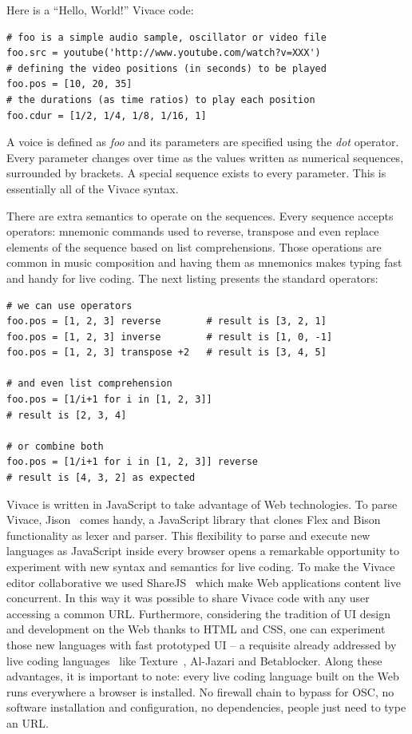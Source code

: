 \documentclass[letterpaper, 12pt]{article}
\begin{document}
Here is a ``Hello, World!'' Vivace code:

\begin{Verbatim}[fontfamily=courier, xleftmargin=\parindent]
# foo is a simple audio sample, oscillator or video file
foo.src = youtube('http://www.youtube.com/watch?v=XXX')
# defining the video positions (in seconds) to be played
foo.pos = [10, 20, 35]
# the durations (as time ratios) to play each position
foo.cdur = [1/2, 1/4, 1/8, 1/16, 1]
\end{Verbatim}

A voice is defined as \textit{foo} and its parameters are specified
using the \textit{dot} operator. Every parameter changes over time as
the values written as numerical sequences, surrounded by brackets. A
special sequence exists to every parameter. This is essentially all of
the Vivace syntax.

There are extra semantics to operate on the sequences. Every sequence
accepts operators: mnemonic commands used to reverse, transpose and
even replace elements of the sequence based on list
comprehensions. Those operations are common in music composition and
having them as mnemonics makes typing fast and handy for live
coding. The next listing presents the standard operators:

\begin{Verbatim}[fontfamily=courier, xleftmargin=\parindent]
# we can use operators
foo.pos = [1, 2, 3] reverse        # result is [3, 2, 1]
foo.pos = [1, 2, 3] inverse        # result is [1, 0, -1]
foo.pos = [1, 2, 3] transpose +2   # result is [3, 4, 5]

# and even list comprehension
foo.pos = [1/i+1 for i in [1, 2, 3]] 
# result is [2, 3, 4]

# or combine both
foo.pos = [1/i+1 for i in [1, 2, 3]] reverse 
# result is [4, 3, 2] as expected
\end{Verbatim}

Vivace is written in JavaScript to take advantage of Web technologies.
To parse Vivace, Jison~\citep*{jison} comes handy, a JavaScript
library that clones Flex and Bison functionality as lexer and
parser. This flexibility to parse and execute new languages as
JavaScript inside every browser opens a remarkable opportunity to
experiment with new syntax and semantics for live coding. To make the
Vivace editor collaborative we used ShareJS~\citep{sharejs} which make
Web applications content live concurrent. In this way it was possible
to share Vivace code with any user accessing a common
URL. Furthermore, considering the tradition of UI design and
development on the Web thanks to HTML and CSS, one can experiment
those new languages with fast prototyped UI -- a requisite already
addressed by live coding languages~\citep{mclean2010visualisation,
  magnusson2011algorithms} like Texture~\citep*{mclean2011texture},
Al-Jazari and Betablocker. Along these advantages, it is important to
note: every live coding language built on the Web runs everywhere a
browser is installed. No firewall chain to bypass for OSC, no software
installation and configuration, no dependencies, people just need to
type an URL.
\end{document}
